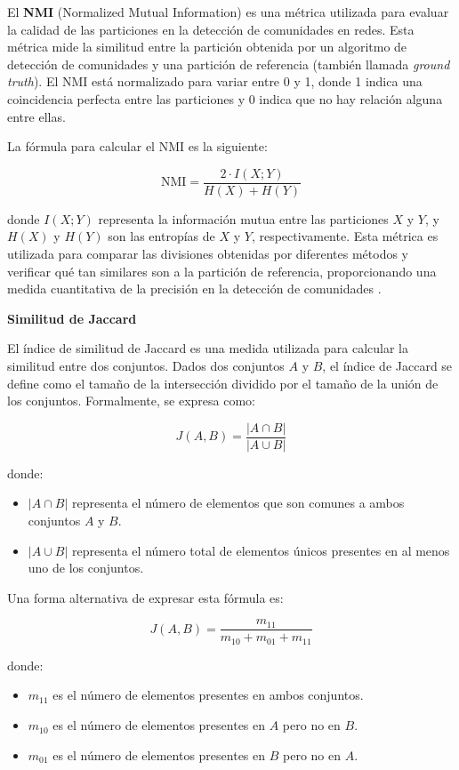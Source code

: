 \documentclass[11pt,a4paper,twoside,openany]{tesis}
\begin{document}
El \textbf{NMI} (Normalized Mutual Information) es una métrica utilizada para evaluar la calidad de las particiones en la detección de comunidades en redes. Esta métrica mide la similitud entre la partición obtenida por un algoritmo de detección de comunidades y una partición de referencia (también llamada \emph{ground truth}). El NMI está normalizado para variar entre 0 y 1, donde 1 indica una coincidencia perfecta entre las particiones y 0 indica que no hay relación alguna entre ellas.

La fórmula para calcular el NMI es la siguiente:

\[
\text{NMI} = \frac{2 \cdot I(X; Y)}{H(X) + H(Y)}
\]

donde \( I(X; Y) \) representa la información mutua entre las particiones \(X\) y \(Y\), y \( H(X) \) y \( H(Y) \) son las entropías de \(X\) y \(Y\), respectivamente. Esta métrica es utilizada para comparar las divisiones obtenidas por diferentes métodos y verificar qué tan similares son a la partición de referencia, proporcionando una medida cuantitativa de la precisión en la detección de comunidades \cite{nmi}.

\textbf{Similitud de Jaccard}

El índice de similitud de Jaccard es una medida utilizada para calcular la similitud entre dos conjuntos. Dados dos conjuntos \( A \) y \( B \), el índice de Jaccard se define como el tamaño de la intersección dividido por el tamaño de la unión de los conjuntos. Formalmente, se expresa como:

\[
J(A, B) = \frac{|A \cap B|}{|A \cup B|}
\]

donde:
\begin{itemize}
    \item \( |A \cap B| \) representa el número de elementos que son comunes a ambos conjuntos \( A \) y \( B \).
    \item \( |A \cup B| \) representa el número total de elementos únicos presentes en al menos uno de los conjuntos.
\end{itemize}

Una forma alternativa de expresar esta fórmula es:

\[
J(A, B) = \frac{m_{11}}{m_{10} + m_{01} + m_{11}}
\]

donde:
\begin{itemize}
    \item \( m_{11} \) es el número de elementos presentes en ambos conjuntos.
    \item \( m_{10} \) es el número de elementos presentes en \( A \) pero no en \( B \).
    \item \( m_{01} \) es el número de elementos presentes en \( B \) pero no en \( A \).
\end{itemize}
\end{document}
